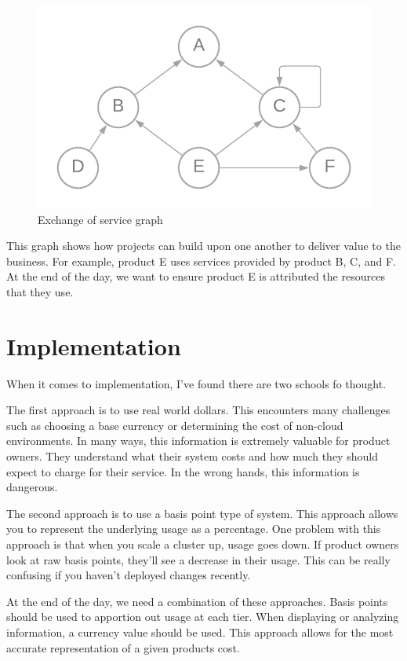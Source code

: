 \documentclass[10pt, a4paper, twocolumn]{article}
\begin{document}
    \begin{figure}[H]
      \centering
      \includegraphics[width=\linewidth]{./truth-and-reconciliation-graph.png}
      \caption{Exchange of service graph}
      \label{figure:2}
    \end{figure}

    This graph shows how projects can build upon one another to deliver value to the business.
    For example, product E uses services provided by product B, C, and F.
    At the end of the day, we want to ensure product E is attributed the resources that they use.

\section*{Implementation}
  When it comes to implementation, I've found there are two schools fo thought.

  The first approach is to use real world dollars.
  This encounters many challenges such as choosing a base currency or determining the cost of non-cloud environments.
  In many ways, this information is extremely valuable for product owners.
  They understand what their system costs and how much they should expect to charge for their service.
  In the wrong hands, this information is dangerous.

  The second approach is to use a basis point type of system.
  This approach allows you to represent the underlying usage as a percentage.
  One problem with this approach is that when you scale a cluster up, usage goes down.
  If product owners look at raw basis points, they'll see a decrease in their usage.
  This can be really confusing if you haven't deployed changes recently.

  At the end of the day, we need a combination of these approaches.
  Basis points should be used to apportion out usage at each tier.
  When displaying or analyzing information, a currency value should be used.
  This approach allows for the most accurate representation of a given products cost.
\end{document}
